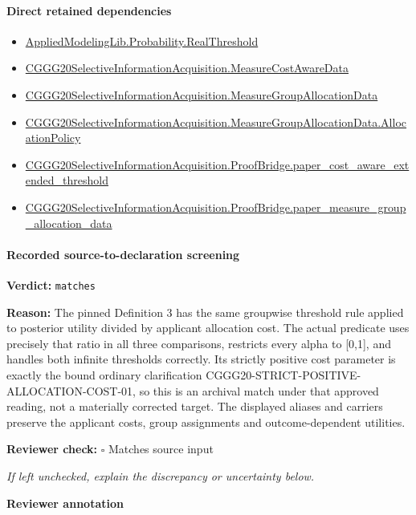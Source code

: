 \documentclass[10pt]{article}
\newcommand{\reviewerbox}{%
  \par\noindent\fbox{\parbox{0.96\linewidth}{\rule{0pt}{0.38in}}}\par
}
\newcommand{\reviewmatch}[1]{%
  \par\noindent\textbf{Reviewer check:} $\square$\; #1\par
  \noindent\emph{If left unchecked, explain the discrepancy or uncertainty below.}\par
}
\begin{document}
\paragraph{Direct retained dependencies}
\begin{itemize}\raggedright
\item \hyperlink{governing-declaration-41082d9d716d6171}{Applied\allowbreak{}Modeling\allowbreak{}Lib.\allowbreak{}Probability.\allowbreak{}Real\allowbreak{}Threshold}
\item \hyperlink{governing-declaration-254893ae2d19bfc7}{CGGG20\allowbreak{}Selective\allowbreak{}Information\allowbreak{}Acquisition.\allowbreak{}Measure\allowbreak{}Cost\allowbreak{}Aware\allowbreak{}Data}
\item \hyperlink{governing-declaration-da82fc25816f69f3}{CGGG20\allowbreak{}Selective\allowbreak{}Information\allowbreak{}Acquisition.\allowbreak{}Measure\allowbreak{}Group\allowbreak{}Allocation\allowbreak{}Data}
\item \hyperlink{governing-declaration-ae6a1576674ada0a}{CGGG20\allowbreak{}Selective\allowbreak{}Information\allowbreak{}Acquisition.\allowbreak{}Measure\allowbreak{}Group\allowbreak{}Allocation\allowbreak{}Data.\allowbreak{}Allocation\allowbreak{}Policy}
\item \hyperlink{governing-declaration-32adde700de18806}{CGGG20\allowbreak{}Selective\allowbreak{}Information\allowbreak{}Acquisition.\allowbreak{}Proof\allowbreak{}Bridge.\allowbreak{}paper\_\allowbreak{}cost\_\allowbreak{}aware\_\allowbreak{}extended\_\allowbreak{}threshold}
\item \hyperlink{governing-declaration-8746c73995dc5f78}{CGGG20\allowbreak{}Selective\allowbreak{}Information\allowbreak{}Acquisition.\allowbreak{}Proof\allowbreak{}Bridge.\allowbreak{}paper\_\allowbreak{}measure\_\allowbreak{}group\_\allowbreak{}allocation\_\allowbreak{}data}
\end{itemize}
\paragraph{Recorded source-to-declaration screening}
\textbf{Verdict:} \texttt{matches}
\\
{\raggedright
\textbf{Reason:} The pinned Definition 3 has the same groupwise threshold rule applied to posterior utility divided by applicant allocation cost.\allowbreak{} The actual predicate uses precisely that ratio in all three comparisons, restricts every alpha to [0,1], and handles both infinite thresholds correctly.\allowbreak{} Its strictly positive cost parameter is exactly the bound ordinary clarification CGGG20-\allowbreak{}STRICT-\allowbreak{}POSITIVE-\allowbreak{}ALLOCATION-\allowbreak{}COST-\allowbreak{}01, so this is an archival match under that approved reading, not a materially corrected target.\allowbreak{} The displayed aliases and carriers preserve the applicant costs, group assignments and outcome-\allowbreak{}dependent utilities.\allowbreak{}
\par}
\reviewmatch{Matches source input}
\noindent\textbf{Reviewer annotation}\par
\reviewerbox
\clearpage
\hypertarget{paper-prerequisite-88f67c493873ffe9}{}
\end{document}
